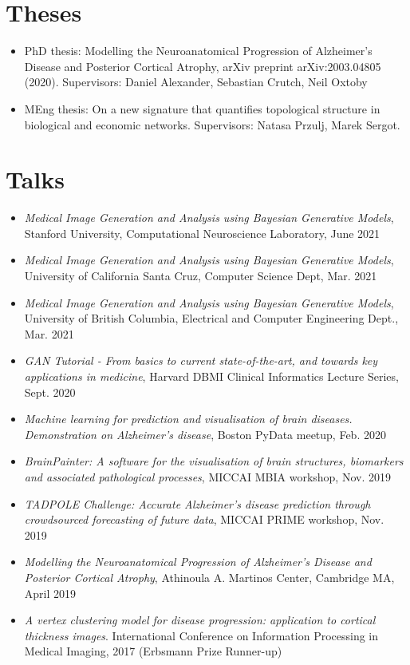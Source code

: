 \documentclass[a4paper,10pt]{article} %
\begin{document}
\section*{Theses}
\begin{itemize}
 \item PhD thesis: Modelling the Neuroanatomical Progression of Alzheimer's Disease and Posterior Cortical Atrophy, arXiv preprint arXiv:2003.04805 (2020). Supervisors: Daniel Alexander, Sebastian Crutch, Neil Oxtoby
  \item MEng thesis: On a new signature that quantifies topological structure in biological and economic networks. Supervisors: Natasa Przulj, Marek Sergot.
\end{itemize}

\section*{Talks}
\begin{itemize}
 \item \emph{Medical Image Generation and Analysis using Bayesian Generative Models}, Stanford University, Computational Neuroscience Laboratory, June 2021
 \item \emph{Medical Image Generation and Analysis using Bayesian Generative Models}, University of California Santa Cruz, Computer Science Dept, Mar. 2021
 \item \emph{Medical Image Generation and Analysis using Bayesian Generative Models}, University of British Columbia, Electrical and Computer Engineering Dept., Mar. 2021
 \item \emph{GAN Tutorial - From basics to current state-of-the-art, and towards key applications in medicine}, Harvard DBMI Clinical Informatics Lecture Series, Sept. 2020
 \item \emph{Machine learning for prediction and visualisation of brain diseases. Demonstration on Alzheimer's disease}, Boston PyData meetup, Feb. 2020
 \item \emph{BrainPainter: A software for the visualisation of brain structures, biomarkers and associated pathological processes}, MICCAI MBIA workshop, Nov. 2019
 \item \emph{TADPOLE Challenge: Accurate Alzheimer's disease prediction through crowdsourced forecasting of future data}, MICCAI PRIME workshop, Nov. 2019
 \item \emph{Modelling the Neuroanatomical Progression of Alzheimer's Disease and Posterior Cortical Atrophy}, Athinoula A. Martinos Center, Cambridge MA, April 2019
 \item \emph{A vertex clustering model for disease progression: application to cortical thickness images}. International Conference on Information Processing in Medical Imaging, 2017 (Erbsmann Prize Runner-up)
\end{itemize}
\end{document}
